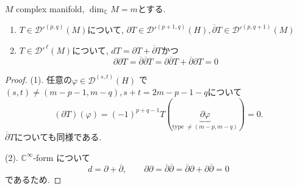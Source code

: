 \begin{tcolorbox}[mybox]
\begin{lem}
\label{lem-M-4.14}
\(M\) complex manifold, \(\dim_{\mathbb{C}}M=m\)とする.
\begin{enumerate}
\item \( T\in \mathcal{D}'^{(p,q)}(M)\)について, 
\( \partial T\in \mathcal{D}'^{(p+1,q)}(H), \overline{\partial}T\in \mathcal{D}'^{(p,q+1)}(M)\)
\item \(T\in \mathcal{D}'^{\,\ell}(M)\)について, 
\(dT=\partial T+\overline{\partial}T\)かつ
\[ \partial\partial T=\overline{\partial}\overline{\partial}T=\partial\overline{\partial}T+\overline{\partial}\partial T=0
\]
\end{enumerate}
\end{lem}
\end{tcolorbox}

\begin{proof}
(1). 
任意の\(\varphi\in \mathcal{D}^{(s,t)}(H)\)
で\((s,t)\neq (m-p-1,m-q), s+t=2m-p-1-q\)について
\[
(\partial T)(\varphi)
=(-1)^{p+q-1}T(\underbrace{\partial \varphi}_{\text{type }\neq (m-p,m-q) })=0.
\]
\(\overline{\partial}T\)についても同様である. 

(2). \(\mathbb{C}^{\infty}\)-form について
\[
d=\partial+\overline{\partial},\qquad \partial\partial=\overline{\partial}\overline{\partial}
=\overline{\partial}\partial+\partial\overline{\partial}=0
\]
であるため. 
\end{proof}


